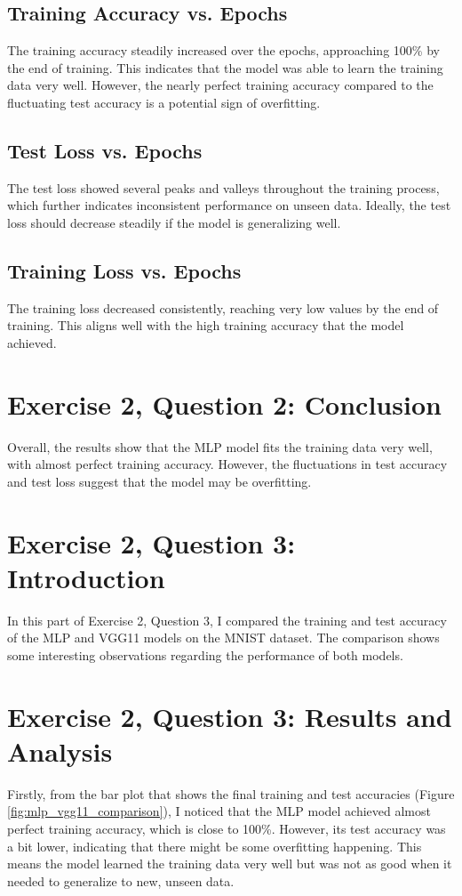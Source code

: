 \documentclass[10pt,letter,notitlepage]{article}
\begin{document}
\begin{center}
\subsection{Training Accuracy vs. Epochs}
The training accuracy steadily increased over the epochs, approaching 100\% by the end of training. This indicates that the model was able to learn the training data very well. However, the nearly perfect training accuracy compared to the fluctuating test accuracy is a potential sign of overfitting.

\subsection{Test Loss vs. Epochs}
The test loss showed several peaks and valleys throughout the training process, which further indicates inconsistent performance on unseen data. Ideally, the test loss should decrease steadily if the model is generalizing well.

\subsection{Training Loss vs. Epochs}
The training loss decreased consistently, reaching very low values by the end of training. This aligns well with the high training accuracy that the model achieved.
\section{Exercise 2, Question 2: Conclusion}
Overall, the results show that the MLP model fits the training data very well, with almost perfect training accuracy. However, the fluctuations in test accuracy and test loss suggest that the model may be overfitting. 

\section{Exercise 2, Question 3: Introduction}
In this part of Exercise 2, Question 3, I compared the training and test accuracy of the MLP and VGG11 models on the MNIST dataset. The comparison shows some interesting observations regarding the performance of both models.

\section{Exercise 2, Question 3: Results and Analysis}
Firstly, from the bar plot that shows the final training and test accuracies (Figure \ref{fig:mlp_vgg11_comparison}), I noticed that the MLP model achieved almost perfect training accuracy, which is close to 100\%. However, its test accuracy was a bit lower, indicating that there might be some overfitting happening. This means the model learned the training data very well but was not as good when it needed to generalize to new, unseen data.


\end{center}
\end{document}
